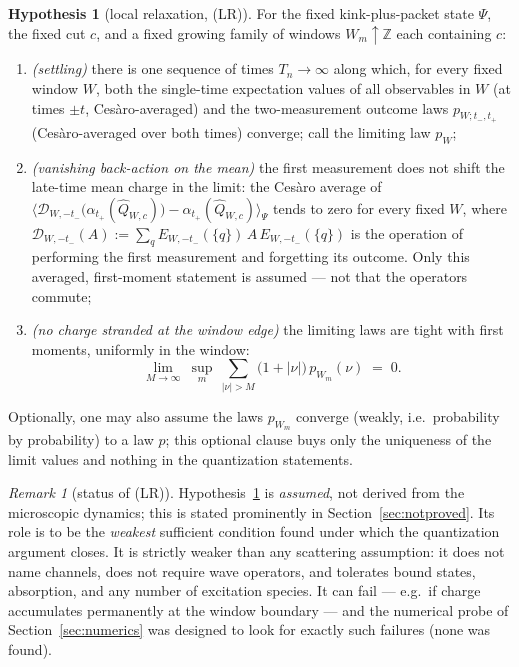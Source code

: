 \documentclass[11pt]{article}
\theoremstyle{definition}
\newtheorem{hypothesis}[theorem]{Hypothesis}
\theoremstyle{remark}
\newtheorem{remark}[theorem]{Remark}
\newcommand{\Z}{\mathbb{Z}}
\begin{document}
\begin{hypothesis}[local relaxation, (LR)]\label{hyp:lr}
For the fixed kink-plus-packet state $\Psi$, the fixed cut $c$, and a fixed
growing family of windows $W_m\uparrow\Z$ each containing $c$:
\begin{enumerate}
\item[(i)] \emph{(settling)} there is one sequence of times $T_n\to\infty$
along which, for every fixed window $W$, both the single-time expectation
values of all observables in $W$ (at times $\pm t$, Ces\`aro-averaged) and
the two-measurement outcome laws $p_{W;t_-,t_+}$ (Ces\`aro-averaged over both
times) converge; call the limiting law $p_W$;
\item[(ii)] \emph{(vanishing back-action on the mean)} the first measurement
does not shift the late-time mean charge in the limit: the Ces\`aro average
of $\bigl\langle \mathcal{D}_{W,-t_-}\bigl(\alpha_{t_+}(\widehat Q_{W,c})\bigr)
-\alpha_{t_+}(\widehat Q_{W,c})\bigr\rangle_\Psi$ tends to zero for every
fixed $W$, where $\mathcal{D}_{W,-t_-}(A):=\sum_q E_{W,-t_-}(\{q\})\,A\,
E_{W,-t_-}(\{q\})$ is the operation of performing the first measurement and
forgetting its outcome.  Only this averaged, first-moment statement is
assumed --- not that the operators commute;
\item[(iii)] \emph{(no charge stranded at the window edge)} the limiting laws
are tight with first moments, uniformly in the window:
\[
\lim_{M\to\infty}\ \sup_{m}\ \sum_{|\nu|>M}\bigl(1+|\nu|\bigr)\,p_{W_m}(\nu)\;=\;0 .
\]
\end{enumerate}
Optionally, one may also assume the laws $p_{W_m}$ converge (weakly, i.e.\
probability by probability) to a law $p$; this optional clause buys only the
uniqueness of the limit values and nothing in the quantization statements.
\end{hypothesis}

\begin{remark}[status of (LR)]
Hypothesis~\ref{hyp:lr} is \emph{assumed}, not derived from the microscopic
dynamics; this is stated prominently in Section~\ref{sec:notproved}.  Its
role is to be the \emph{weakest} sufficient condition found under which the
quantization argument closes.  It is strictly weaker than any scattering
assumption: it does not name channels, does not require wave operators, and
tolerates bound states, absorption, and any number of excitation species.
It can fail --- e.g.\ if charge accumulates permanently at the window
boundary --- and the numerical probe of Section~\ref{sec:numerics} was
designed to look for exactly such failures (none was found).
\end{remark}
\end{document}
